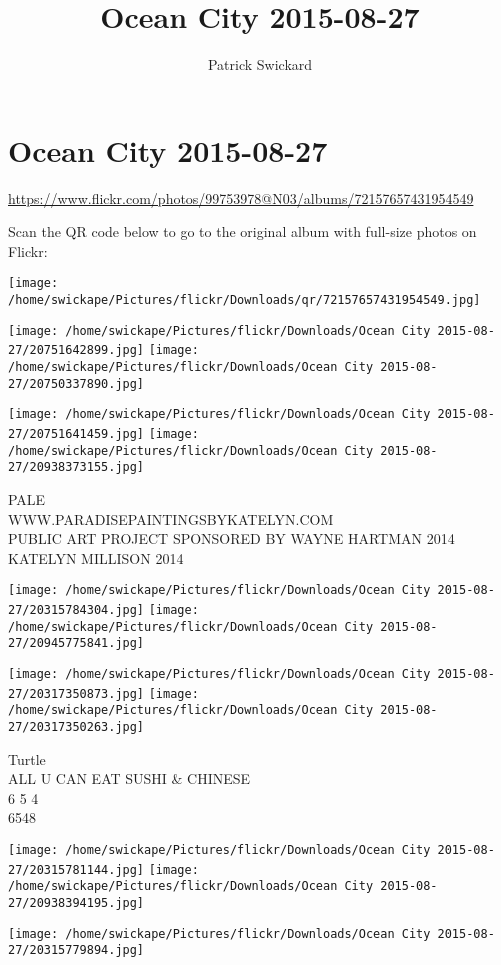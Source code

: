 \documentclass[10pt,letterpaper]{article}
\title{Ocean City 2015-08-27}
\author{Patrick Swickard}
\date{}
\begin{document}
\section*{Ocean City 2015-08-27}

\url{https://www.flickr.com/photos/99753978@N03/albums/72157657431954549}

Scan the QR code below to go to the original album with full-size photos on Flickr:

\texttt{[image: /home/swickape/Pictures/flickr/Downloads/qr/72157657431954549.jpg]}
\pagebreak

\texttt{[image: /home/swickape/Pictures/flickr/Downloads/Ocean City 2015-08-27/20751642899.jpg]}
\texttt{[image: /home/swickape/Pictures/flickr/Downloads/Ocean City 2015-08-27/20750337890.jpg]}

\texttt{[image: /home/swickape/Pictures/flickr/Downloads/Ocean City 2015-08-27/20751641459.jpg]}
\texttt{[image: /home/swickape/Pictures/flickr/Downloads/Ocean City 2015-08-27/20938373155.jpg]}

PALE\\
WWW.PARADISEPAINTINGSBYKATELYN.COM\\
PUBLIC ART PROJECT SPONSORED BY WAYNE HARTMAN 2014\\
KATELYN MILLISON 2014
\pagebreak

\texttt{[image: /home/swickape/Pictures/flickr/Downloads/Ocean City 2015-08-27/20315784304.jpg]}
\texttt{[image: /home/swickape/Pictures/flickr/Downloads/Ocean City 2015-08-27/20945775841.jpg]}

\texttt{[image: /home/swickape/Pictures/flickr/Downloads/Ocean City 2015-08-27/20317350873.jpg]}
\texttt{[image: /home/swickape/Pictures/flickr/Downloads/Ocean City 2015-08-27/20317350263.jpg]}

Turtle\\
ALL U CAN EAT SUSHI \& CHINESE\\
6 5 4\\
6548
\pagebreak

\texttt{[image: /home/swickape/Pictures/flickr/Downloads/Ocean City 2015-08-27/20315781144.jpg]}
\texttt{[image: /home/swickape/Pictures/flickr/Downloads/Ocean City 2015-08-27/20938394195.jpg]}

\vspace{0.25in}
\texttt{[image: /home/swickape/Pictures/flickr/Downloads/Ocean City 2015-08-27/20315779894.jpg]}
\end{document}
